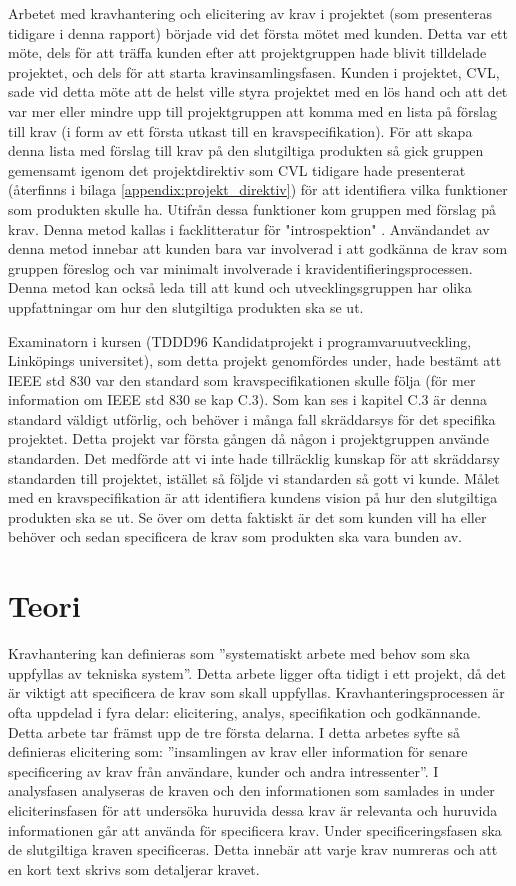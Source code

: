 Arbetet med kravhantering och elicitering av krav i projektet (som presenteras tidigare i denna rapport) började vid det första mötet med kunden. Detta var ett möte, dels för att träffa kunden efter att projektgruppen hade blivit tilldelade projektet, och dels för att starta kravinsamlingsfasen. Kunden i projektet, CVL, sade vid detta möte att de helst ville styra projektet med en lös hand och att det var mer eller mindre upp till projektgruppen att komma med en lista på förslag till krav (i form av ett första utkast till en kravspecifikation). För att skapa denna lista med förslag till krav på den slutgiltiga produkten så gick gruppen gemensamt igenom det projektdirektiv som CVL tidigare hade presenterat (återfinns i bilaga \ref{appendix:projekt_direktiv}) för att identifiera vilka funktioner som produkten skulle ha. Utifrån dessa funktioner kom gruppen med förslag på krav. Denna metod kallas i facklitteratur för "introspektion" \cite{goguen1993techniques}. Användandet av denna metod innebar att kunden bara var involverad i att godkänna de krav som gruppen föreslog och var minimalt involverade i kravidentifieringsprocessen. Denna metod kan också leda till att kund och utvecklingsgruppen har olika uppfattningar om hur den slutgiltiga produkten ska se ut. 

Examinatorn i kursen (TDDD96 Kandidatprojekt i programvaruutveckling, Linköpings universitet), som detta projekt genomfördes under, hade bestämt att IEEE std 830 var den standard som kravspecifikationen skulle följa (för mer information om IEEE std 830 se kap C.3). Som kan ses i kapitel C.3 är denna standard väldigt utförlig, och behöver i många fall skräddarsys för det specifika projektet. Detta projekt var första gången då någon i projektgruppen använde standarden. Det medförde att vi inte hade tillräcklig kunskap för att skräddarsy standarden till projektet, istället så följde vi standarden så gott vi kunde. Målet med en kravspecifikation är att identifiera kundens vision på hur den slutgiltiga produkten ska se ut. Se över om detta faktiskt är det som kunden vill ha eller behöver och sedan specificera de krav som produkten ska vara bunden av. 


\section{Teori}
\label{sec:theory-jannering}
Kravhantering kan definieras som ”systematiskt arbete med behov som ska uppfyllas av tekniska system”. Detta arbete ligger ofta tidigt i ett projekt, då det är viktigt att specificera de krav som skall uppfyllas. Kravhanteringsprocessen är ofta uppdelad i fyra delar: elicitering, analys, specifikation och godkännande. Detta arbete tar främst upp de tre första delarna. I detta arbetes syfte så definieras elicitering som: ”insamlingen av krav eller information för senare specificering av krav från användare, kunder och andra intressenter”. I analysfasen analyseras de kraven och den informationen som samlades in under eliciterinsfasen för att undersöka huruvida dessa krav är relevanta och huruvida informationen går att använda för specificera krav. Under specificeringsfasen ska de slutgiltiga kraven specificeras. Detta innebär att varje krav numreras och att en kort text skrivs som detaljerar kravet.
